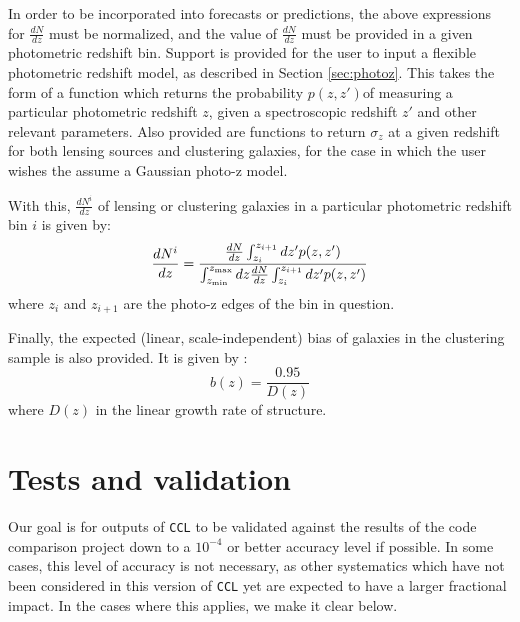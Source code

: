 \documentclass[\docopts]{\docclass}
\begin{document}
In order to be incorporated into forecasts or predictions, the above expressions for $\frac{dN}{dz}$ must be normalized, and the value of $\frac{dN}{dz}$ must be provided in a given photometric redshift bin. Support is provided for the user to input a flexible photometric redshift model, as described in Section \ref{sec:photoz}. This takes the form of a function which returns the probability $p(z,z')$of measuring a particular photometric redshift $z$, given a spectroscopic redshift $z'$ and other relevant parameters. Also provided are functions to return $\sigma_z$ at a given redshift for both lensing sources and clustering galaxies, for the case in which the user wishes the assume a Gaussian photo-z model.

With this, $\frac{dN^i}{dz}$ of lensing or clustering galaxies in a particular photometric redshift bin $i$ is given by:
\begin{equation}
\frac{dN^i}{dz} = \frac{\frac{dN}{dz}\int_{z_i}^{z_{i+1}} dz' p(z,z')}{\int_{z_{\rm min}}^{z_{\rm max}}dz \frac{dN}{dz} \int_{z_i}^{z_{i+1}}dz' p(z, z')}
\label{photoz}
\end{equation}
where $z_{i}$ and $z_{i+1}$ are the photo-z edges of the bin in question. 

Finally, the expected (linear, scale-independent) bias of galaxies in the clustering sample is also provided. It is given by \cite{ScienceBook}:
\begin{equation}
b(z) = \frac{0.95}{D(z)}
\label{clustbias}
\end{equation}
where $D(z)$ in the linear growth rate of structure.

\section{Tests and validation}
\label{sec:tests}

Our goal is for outputs of {\tt CCL} to be validated against the results of the code comparison project down to a $10^{-4}$ or better accuracy level if possible. In some cases, this level of accuracy is not necessary, as other systematics which have not been considered in this version of {\tt CCL} yet are expected to have a larger fractional impact. In the cases where this applies, we make it clear below. 
\end{document}
